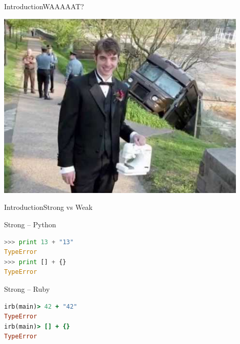 \documentclass[10pt]{beamer}
\begin{document}
\begin{frame}{Introduction}{WAAAAAT?}
	\begin{center}
		\includegraphics[width=0.9\textwidth]{pictures/wat.jpg}
	\end{center}
\end{frame}


\begin{frame}[fragile]{Introduction}{Strong vs Weak}
	
\begin{center}
		
\begin{block}{Strong -- Python}
\begin{lstlisting}[language=Python]
>>> print 13 + "13"
TypeError
>>> print [] + {}
TypeError
\end{lstlisting}
\end{block}

\pause

\begin{block}{Strong -- Ruby}
\begin{lstlisting}[language=Ruby]
irb(main)> 42 + "42"
TypeError
irb(main)> [] + {}
TypeError
\end{lstlisting}
\end{block}
		
\end{center}
	
\end{frame}
\end{document}
